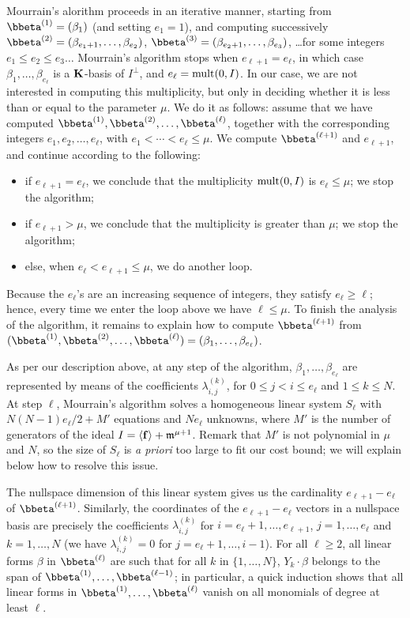 \documentclass[12pt]{article}
\begin{document}
Mourrain's alorithm proceeds in an iterative manner, starting from
$\bbeta^{(1)}=(\beta_{1})$ (and setting $e_1=1$), and computing
successively $\bbeta^{(2)}=(\beta_{e_1+1},\dots,\beta_{e_2})$,
$\bbeta^{(3)}=(\beta_{e_2+1},\dots,\beta_{e_3})$, \dots for some
integers $e_1 \le e_2 \le e_3 \dots$ Mourrain's algorithm stops when
$e_{\ell+1}=e_{\ell}$, in which case $\beta_1,\dots,\beta_{e_\ell}$ is
a $\mathbf{K}$-basis of $I^\perp$, and $e_\ell=\mathrm{mult}(0,I)$. In our case, we
are not interested in computing this multiplicity, but only in
deciding whether it is less than or equal to the parameter $\mu$. We do it as follows: assume that we have
computed $\bbeta^{(1)},\bbeta^{(2)},\dots,\bbeta^{(\ell)}$, together
with the corresponding integers $e_1,e_2,\dots,e_\ell$, with $e_1 <
\cdots < e_\ell \le \mu$. We compute $\bbeta^{(\ell+1)}$ and $e_{\ell+1}$,
and continue according to the following:
\begin{itemize}
\item if $e_{\ell+1}=e_{\ell}$, we conclude that the multiplicity $\mathrm{mult}(0,I)$
  is $e_\ell \le \mu$; we stop the algorithm;
\item if $e_{\ell+1} > \mu$, we conclude that the multiplicity is greater 
  than $\mu$; we stop the algorithm;
\item else, when $e_\ell < e_{\ell+1} \le \mu$, we do another loop.
\end{itemize}
Because the $e_\ell$'s are an increasing sequence of integers, they
satisfy $e_\ell \ge \ell$; hence, every time we enter the loop above we
have $\ell \le \mu$. To finish the analysis of the algorithm, it
remains to explain how to compute $\bbeta^{(\ell+1)}$ from
$(\bbeta^{(1)},\bbeta^{(2)},\dots,\bbeta^{(\ell)})=(\beta_{1},\dots,\beta_{e_\ell})$.

As per our description above, at any step of the algorithm,
$\beta_{1},\dots,\beta_{e_\ell}$ are represented by means of the
coefficients $\lambda^{(k)}_{i,j}$, for $0 \le j < i \le e_{\ell}$ and
$1 \le k \le N$.  At step $\ell$, Mourrain's algorithm solves a homogeneous linear system
$S_\ell$ with $N(N-1) e_\ell/2+M'$ equations and $N e_\ell$ unknowns,
where $M'$ is the number of generators of the ideal $I= \langle \mathbf{f}
\rangle + \mathfrak{m}^{\mu+1}$. Remark that $M'$ is not polynomial in $\mu$ 
and $N$, so the size of $S_\ell$ is {\em a priori} too large to 
fit our cost bound; we will explain below how to resolve this issue.

The nullspace dimension of this linear system gives us the cardinality
$e_{\ell+1}-e_{\ell}$ of $\bbeta^{(\ell+1)}$. Similarly, the coordinates of
the $e_{\ell+1}-e_{\ell}$ vectors in a nullspace basis are precisely
the coefficients $\lambda^{(k)}_{i,j}$ for
$i=e_{\ell}+1,\dots,e_{\ell+1}$, $j=1,\dots,e_\ell$ and $k=1,\dots,N$
(we have $\lambda^{(k)}_{i,j}=0$ for $j=e_{\ell}+1,\dots,i-1$). For
all $\ell \ge 2$, all linear forms $\beta$ in $\bbeta^{(\ell)}$ are
such that for all $k$ in $\{1,\dots,N\}$, $Y_k \cdot \beta$ belongs to
the span of $\bbeta^{(1)},\dots,\bbeta^{(\ell-1)}$; in particular, a
quick induction shows that all linear forms in
$\bbeta^{(1)},\dots,\bbeta^{(\ell)}$ vanish on all monomials of degree
at least $\ell$.
\end{document}
